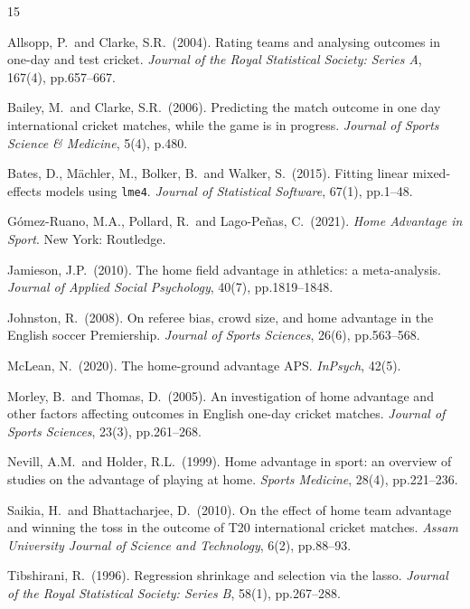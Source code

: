 \documentclass[12pt,a4paper]{article}
\begin{document}
\begin{thebibliography}{15}

Allsopp, P.\ and Clarke, S.R.\ (2004). Rating teams and analysing outcomes in one-day and
test cricket. \textit{Journal of the Royal Statistical Society: Series A}, 167(4),
pp.657--667.

Bailey, M.\ and Clarke, S.R.\ (2006). Predicting the match outcome in one day international
cricket matches, while the game is in progress. \textit{Journal of Sports Science \&
Medicine}, 5(4), p.480.

Bates, D., M\"{a}chler, M., Bolker, B.\ and Walker, S.\ (2015). Fitting linear mixed-effects
models using \texttt{lme4}. \textit{Journal of Statistical Software}, 67(1), pp.1--48.

G\'{o}mez-Ruano, M.A., Pollard, R.\ and Lago-Pe\~{n}as, C.\ (2021).
\textit{Home Advantage in Sport}. New York: Routledge.

Jamieson, J.P.\ (2010). The home field advantage in athletics: a meta-analysis.
\textit{Journal of Applied Social Psychology}, 40(7), pp.1819--1848.

Johnston, R.\ (2008). On referee bias, crowd size, and home advantage in the English soccer
Premiership. \textit{Journal of Sports Sciences}, 26(6), pp.563--568.

McLean, N.\ (2020). The home-ground advantage APS. \textit{InPsych}, 42(5).

Morley, B.\ and Thomas, D.\ (2005). An investigation of home advantage and other factors
affecting outcomes in English one-day cricket matches. \textit{Journal of Sports Sciences},
23(3), pp.261--268.

Nevill, A.M.\ and Holder, R.L.\ (1999). Home advantage in sport: an overview of studies on
the advantage of playing at home. \textit{Sports Medicine}, 28(4), pp.221--236.

Saikia, H.\ and Bhattacharjee, D.\ (2010). On the effect of home team advantage and winning
the toss in the outcome of T20 international cricket matches. \textit{Assam University
Journal of Science and Technology}, 6(2), pp.88--93.

Tibshirani, R.\ (1996). Regression shrinkage and selection via the lasso.
\textit{Journal of the Royal Statistical Society: Series B}, 58(1), pp.267--288.


\end{thebibliography}
\end{document}
